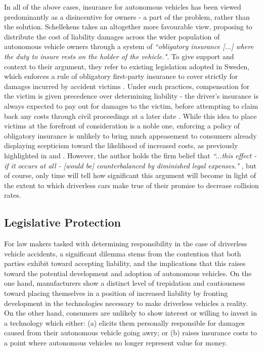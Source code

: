 \documentclass[conference]{IEEEtran}
\begin{document}
In all of the above cases, insurance for autonomous vehicles has been viewed predominantly as a disincentive for owners - a part of the problem, rather than the solution. Schellekens \cite{schellekens} takes an altogether more favourable view, proposing to distribute the cost of liability damages across the wider population of autonomous vehicle owners through a system of \textit{``obligatory insurance [...] where the duty to insure rests on the holder of the vehicle."}. To give support and context to their argument, they refer to existing legislation adopted in Sweden, which enforces a rule of obligatory first-party insurance to cover strictly for damages incurred by accident victims \cite{schellekens}. Under such practices, compensation for the victim is given precedence over determining liability \cite{schellekens} - the driver's insurance is always expected to pay out for damages to the victim, before attempting to claim back any costs through civil proceedings at a later date \cite{schellekens}. While this idea to place victims at the forefront of consideration is a noble one, enforcing a policy of obligatory insurance is unlikely to bring much appeasement to consumers already displaying scepticism toward the likelihood of increased costs, as previously highlighted in \cite{marchant, beiker} and \cite{gurney}. However, the author holds the firm belief that \textit{``...this effect - if it occurs at all -  [would be] counterbalanced by diminished legal expenses."} \cite{schellekens}, but of course, only time will tell how significant this argument will become in light of the extent to which driverless cars make true of their promise to decrease collision rates.

\subsection{Legislative Protection}

For law makers tasked with determining responsibility in the case of driverless vehicle accidents, a significant dilemma stems from the contention that both parties exhibit toward accepting liability, and the implications that this raises toward the potential development and adoption of autonomous vehicles. On the one hand, manufacturers show a distinct level of trepidation and cautiousness toward placing themselves in a position of increased liability by fronting  development in the technologies necessary to make driverless vehicles a reality. On the other hand, consumers are unlikely to show interest or willing to invest in a technology which either: (a) elicits them personally responsible for damages caused from their autonomous vehicle going awry; or (b) raises insurance costs to a point where autonomous vehicles no longer represent  value for money.
\end{document}
